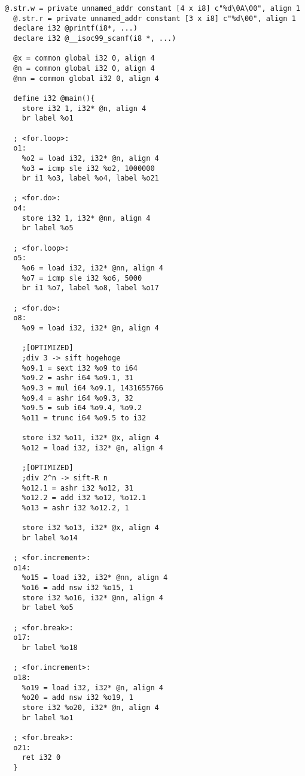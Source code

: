 \begin{lstlisting}[caption={コンパイル結果},label={コンパイル結果}]
  @.str.w = private unnamed_addr constant [4 x i8] c"%d\0A\00", align 1
  @.str.r = private unnamed_addr constant [3 x i8] c"%d\00", align 1
  declare i32 @printf(i8*, ...)
  declare i32 @__isoc99_scanf(i8 *, ...)
  
  @x = common global i32 0, align 4
  @n = common global i32 0, align 4
  @nn = common global i32 0, align 4
  
  define i32 @main(){
    store i32 1, i32* @n, align 4
    br label %o1
  
  ; <for.loop>:
  o1:
    %o2 = load i32, i32* @n, align 4
    %o3 = icmp sle i32 %o2, 1000000
    br i1 %o3, label %o4, label %o21
  
  ; <for.do>:
  o4:
    store i32 1, i32* @nn, align 4
    br label %o5
  
  ; <for.loop>:
  o5:
    %o6 = load i32, i32* @nn, align 4
    %o7 = icmp sle i32 %o6, 5000
    br i1 %o7, label %o8, label %o17
  
  ; <for.do>:
  o8:
    %o9 = load i32, i32* @n, align 4
  
    ;[OPTIMIZED]
    ;div 3 -> sift hogehoge
    %o9.1 = sext i32 %o9 to i64
    %o9.2 = ashr i64 %o9.1, 31
    %o9.3 = mul i64 %o9.1, 1431655766
    %o9.4 = ashr i64 %o9.3, 32
    %o9.5 = sub i64 %o9.4, %o9.2
    %o11 = trunc i64 %o9.5 to i32
  
    store i32 %o11, i32* @x, align 4
    %o12 = load i32, i32* @n, align 4
  
    ;[OPTIMIZED]
    ;div 2^n -> sift-R n
    %o12.1 = ashr i32 %o12, 31
    %o12.2 = add i32 %o12, %o12.1
    %o13 = ashr i32 %o12.2, 1
  
    store i32 %o13, i32* @x, align 4
    br label %o14
  
  ; <for.increment>:
  o14:
    %o15 = load i32, i32* @nn, align 4
    %o16 = add nsw i32 %o15, 1
    store i32 %o16, i32* @nn, align 4
    br label %o5
  
  ; <for.break>:
  o17:
    br label %o18
  
  ; <for.increment>:
  o18:
    %o19 = load i32, i32* @n, align 4
    %o20 = add nsw i32 %o19, 1
    store i32 %o20, i32* @n, align 4
    br label %o1
  
  ; <for.break>:
  o21:
    ret i32 0
  }
  
  
\end{lstlisting}

